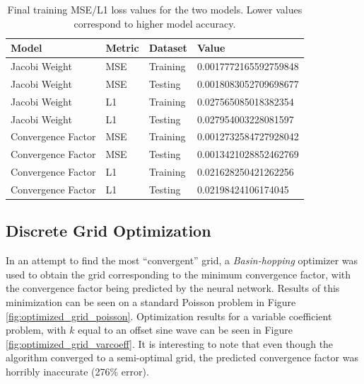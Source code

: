 \begin{table}[t]
\centering
\begin{tabular}{|l|l|l|l|}
\hline
Model & Metric & Dataset & Value \\

\hline
Jacobi Weight & MSE & Training & 0.0017772165592759848 \\
Jacobi Weight & MSE & Testing & 0.0018083052709698677 \\
Jacobi Weight & L1 & Training & 0.027565085018382354 \\
Jacobi Weight & L1 & Testing & 0.027954003228081597\ \\
\hline
Convergence Factor & MSE & Training & 0.0012732584727928042 \\
Convergence Factor & MSE & Testing & 0.0013421028852462769 \\
Convergence Factor & L1 & Training & 0.021628250421262256 \\
Convergence Factor & L1 & Testing & 0.02198424106174045 \\
\hline
\end{tabular}
\caption{Final training MSE/L1 loss values for the two models.  Lower values correspond to higher model accuracy.}
\label{tab:loss}
\end{table}

\subsection{Discrete Grid Optimization}

In an attempt to find the most ``convergent'' grid, a \textit{Basin-hopping} optimizer was used to obtain the grid corresponding to the minimum convergence factor, with the convergence factor being predicted by the neural network.  Results of this minimization can be seen on a standard Poisson problem in Figure \ref{fig:optimized_grid_poisson}.  Optimization results for a variable coefficient problem, with $k$ equal to an offset sine wave can be seen in Figure \ref{fig:optimized_grid_varcoeff}.  It is interesting to note that even though the algorithm converged to a semi-optimal grid, the predicted convergence factor was horribly inaccurate (276\% error).

